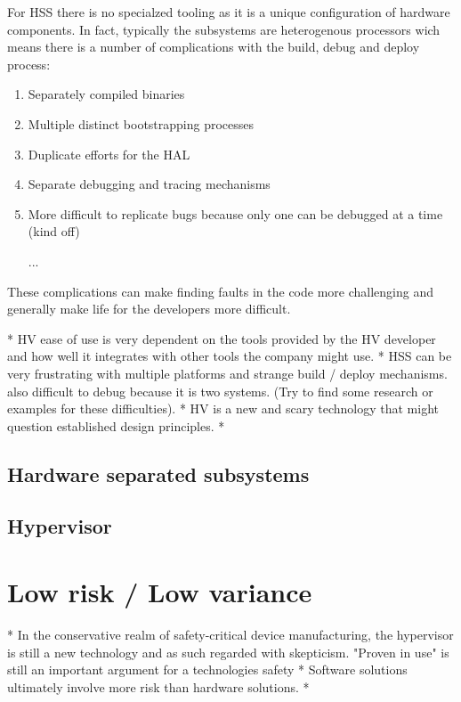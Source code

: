 For \gls{HSS} there is no specialzed tooling as it is a unique configuration of hardware components. In fact, typically the subsystems are heterogenous processors wich means there is a number of complications with the build, debug and deploy process:
\begin{enumerate}
\item Separately compiled binaries
\item Multiple distinct bootstrapping processes
\item Duplicate efforts for the \gls{HAL} %
\item Separate debugging and tracing mechanisms %
\item More difficult to replicate bugs because only one can be debugged at a time (kind off)
\item [...]
\end{enumerate}
These complications can make finding faults in the code more challenging and generally make life for the developers more difficult.

* HV ease of use is very dependent on the tools provided by the HV developer and how well it integrates with other tools the company might use.
* HSS can be very frustrating with multiple platforms and strange build / deploy mechanisms. also difficult to debug because it is two systems. (Try to find some research or examples for these difficulties).
* HV is a new and scary technology that might question established design principles.
* 
\subsection{Hardware separated subsystems}
\subsection{Hypervisor}


\section{Low risk / Low variance}
* In the conservative realm of safety-critical device manufacturing, the hypervisor is still a new technology and as such regarded with skepticism. "Proven in use" is still an important argument for a technologies safety
* Software solutions ultimately involve more risk than hardware solutions.
* 
